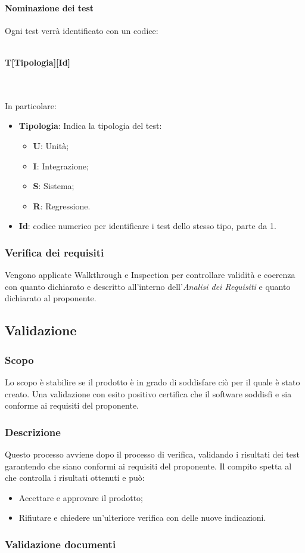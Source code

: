 \paragraph{Nominazione dei test}
Ogni test verrà identificato con un codice: \\ \\
\centerline{\textbf{T[Tipologia][Id]}} \\ \\
In particolare:
\begin{itemize}
\item \textbf{Tipologia}: Indica la tipologia del test:
	\begin{itemize}
	\item \textbf{U}: Unità;
	\item \textbf{I}: Integrazione;
	\item \textbf{S}: Sistema;
	\item \textbf{R}: Regressione.
	\end{itemize}

\item \textbf{Id}: codice numerico per identificare i test dello stesso tipo, parte da 1.

\end{itemize}


\subsubsection{Verifica dei requisiti}
Vengono applicate Walkthrough e Inspection per controllare validità e coerenza con quanto dichiarato e descritto all'interno dell'\textit{Analisi dei Requisiti} e quanto dichiarato al proponente.

\subsection{Validazione}
\subsubsection{Scopo}
Lo scopo è stabilire se il prodotto è in grado di soddisfare ciò per il quale è stato creato. Una validazione con esito positivo certifica che il software soddisfi e sia conforme ai requisiti del proponente.

\subsubsection{Descrizione}
Questo processo avviene dopo il processo di verifica, validando i risultati dei test garantendo che siano conformi ai requisiti del proponente. Il compito spetta al \RE che controlla i risultati ottenuti e può:
\begin{itemize}
\item Accettare e approvare il prodotto;
\item Rifiutare e chiedere un'ulteriore verifica con delle nuove indicazioni.
\end{itemize}

\subsubsection{Validazione documenti}
